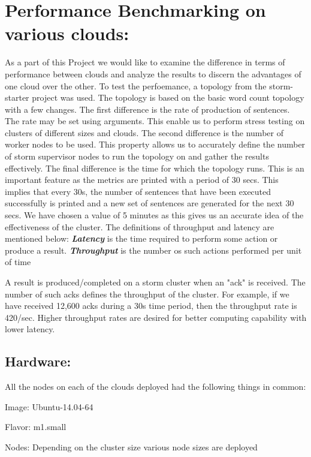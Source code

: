 \documentclass[9pt,twocolumn,twoside]{../../styles/osajnl}
\begin{document}
\section{Performance Benchmarking on various clouds:}
As a part of this Project we would like to examine the difference in terms of 
performance between clouds and analyze the results to discern the advantages of 
one cloud over the other. To test the perfoemance, a topology from the 
storm-starter project was used. The topology is based on the basic word count 
topology with a few changes. The first difference is the rate of production of 
sentences. The rate may be set using arguments. This enable us to perform stress 
testing on clusters of different sizes and clouds. The second difference is the 
number of worker nodes to be used. This property allows us to accurately define 
the number of storm supervisor nodes to run the topology on and gather the results 
effectively. The final difference is the time for which the topology runs. This 
is an important feature as the metrics are printed with a period of 30 secs. This 
implies that every 30s, the number of sentences that have been executed successfully 
is printed and a new set of sentences are generated for the next 30 secs. We have 
chosen a value of 5 minutes as this gives us an accurate idea of the 
effectiveness of the cluster. The definitions of throughput and latency are 
mentioned below:
\textbf{\textit{Latency}} is the time required to perform some action or produce a result.
\textbf{\textit{Throughput}} is the number os such actions performed per unit of time

A result is produced/completed on a storm cluster when an "ack" is received. The 
number of such acks defines the throughput of the cluster. For example, if we 
have received 12,600 acks during a 30s time period, then the throughput rate is 
420/sec. Higher throughput rates are desired for better computing capability 
with lower latency.

\subsection{Hardware:}
All the nodes on each of the clouds deployed had the following things
in common:
\begin{description}
\item Image: Ubuntu-14.04-64
\item Flavor: m1.small
\item Nodes: Depending on the cluster size various node sizes are deployed
\end{description}
\end{document}

